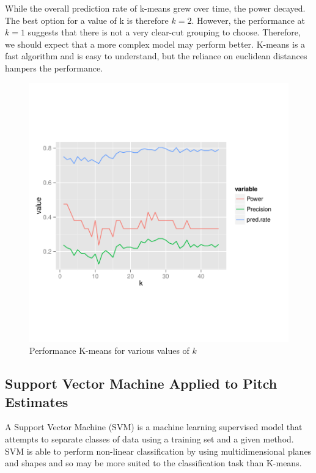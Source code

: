 \documentclass[paper=a4, fontsize=11pt]{scrartcl}
\numberwithin{equation}{section}
\numberwithin{figure}{section}
\numberwithin{table}{section}
\begin{document}
While the overall prediction rate of k-means grew over time, the power decayed. The best option for a value of k is therefore $k=2$. However, the performance at $k=1$ suggests that there is not a very clear-cut grouping to choose. Therefore, we should expect that a more complex model may perform better. K-means is a fast algorithm and is easy to understand, but the reliance on euclidean distances hampers the performance.

\begin{figure}[H]
\begin{center}
\vspace{-100pt}
\includegraphics[width=\textwidth]{k_means.pdf}
\vspace{-120pt}
\caption{Performance K-means for various values of $k$}
\end{center}
\end{figure}

\subsection{Support Vector Machine Applied to Pitch Estimates}
A Support Vector Machine (SVM) is a machine learning supervised model that attempts to separate classes of data using a training set and a given method. SVM is able to perform non-linear classification by using multidimensional planes and shapes and so may be more suited to the classification task than K-means.
\end{document}
